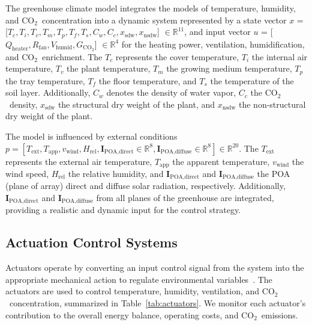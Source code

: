 \documentclass[conference]{IEEEtran}
\newcommand{\coo}{\ensuremath{\mathrm{CO_2}}}
\begin{document}
The greenhouse climate model integrates the models of temperature, humidity, and \coo\ concentration into a dynamic system represented by a state vector \linebreak \(x\) = [\(T_c, T_i, T_v, T_m, T_p, T_f, T_s, C_w, C_c, x_{\text{sdw}}, x_{\text{nsdw}}\)] \( \in\mathbb R^{11} \), and input vector \(u\) = [\(Q_{\text{heater}}, R_{\text{fan}}, V_{\text{humid}}, G_{\coo} \)] \( \in\mathbb R^{4} \) for the heating power, ventilation, humidification, and \coo\ enrichment. The \(T_c\) represents the cover temperature, \(T_i\) the internal air temperature, \(T_v\) the plant temperature, \(T_m\) the growing medium temperature, \(T_p\) the tray temperature, \(T_f\) the floor temperature, and \(T_s\) the temperature of the soil layer. Additionally, \(C_w\) denotes the density of water vapor, \(C_c\) the \coo\ density, \(x_{\text{sdw}}\) the structural dry weight of the plant, and \(x_{\text{nsdw}}\) the non-structural dry weight of the plant.

The model is influenced by external conditions \linebreak \( p = \left[
T_{\text{ext}}, T_{\text{app}}, v_{\text{wind}}, H_{\text{rel}}, \mathbf{I}_{\text{POA,direct}}\in \mathbb{R}^{8}, \mathbf{I}_{\text{POA,diffuse}}\in \mathbb{R}^{8}
\right] \in \mathbb{R}^{20} \). The \(T_{\text{ext}}\) represents the external air temperature, \(T_{\text{app}}\) the apparent temperature, \(v_{\text{wind}}\) the wind speed, \(H_{\text{rel}}\) the relative humidity, and \(\mathbf{I}_{\text{POA,direct}}\) and \(\mathbf{I}_{\text{POA,diffuse}}\) the POA (plane of array) direct and diffuse solar radiation, respectively. Additionally, \(\mathbf{I}_{\text{POA,direct}}\) and \(\mathbf{I}_{\text{POA,diffuse}}\) from all planes of the greenhouse are integrated, providing a realistic and dynamic input for the control strategy.

\subsection{Actuation Control Systems}
Actuators operate by converting an input control signal from the system into the appropriate mechanical action to regulate environmental variables~\cite{Butterfield2018}. The actuators are used to control temperature, humidity, ventilation, and \coo\ concentration, summarized in Table~\ref{tab:actuators}. We monitor each actuator's contribution to the overall energy balance, operating costs, and \coo\ emissions.
\end{document}
